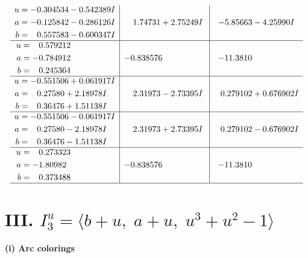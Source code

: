 \documentclass[1p]{elsarticle_modified}
\theoremstyle{definition}
\begin{document}
$$\begin{array}{c|c|c}
\begin{aligned}
u &= -0.304534 - 0.542389 I \\
a &= -0.125842 - 0.286126 I \\
b &= \phantom{-}0.557583 - 0.600347 I\end{aligned}
 & \phantom{-}1.74731 + 2.75249 I & -5.85663 - 4.25990 I \\ \hline\begin{aligned}
u &= \phantom{-}0.579212\phantom{ +0.000000I} \\
a &= -0.784912\phantom{ +0.000000I} \\
b &= \phantom{-}0.245364\phantom{ +0.000000I}\end{aligned}
 & -0.838576\phantom{ +0.000000I} & -11.3810\phantom{ +0.000000I} \\ \hline\begin{aligned}
u &= -0.551506 + 0.061917 I \\
a &= \phantom{-}0.27580 + 2.18978 I \\
b &= \phantom{-}0.36476 + 1.51138 I\end{aligned}
 & \phantom{-}2.31973 - 2.73395 I & \phantom{-}0.279102 + 0.676902 I \\ \hline\begin{aligned}
u &= -0.551506 - 0.061917 I \\
a &= \phantom{-}0.27580 - 2.18978 I \\
b &= \phantom{-}0.36476 - 1.51138 I\end{aligned}
 & \phantom{-}2.31973 + 2.73395 I & \phantom{-}0.279102 - 0.676902 I \\ \hline\begin{aligned}
u &= \phantom{-}0.273323\phantom{ +0.000000I} \\
a &= -1.80982\phantom{ +0.000000I} \\
b &= \phantom{-}0.373488\phantom{ +0.000000I}\end{aligned}
 & -0.838576\phantom{ +0.000000I} & -11.3810\phantom{ +0.000000I}\\
 \hline 
 \end{array}$$\newpage\newpage\renewcommand{\arraystretch}{1}
\centering \section*{III. $I^u_{3}= \langle b+u,\;a+u,\;u^3+u^2-1 \rangle$}
\flushleft \textbf{(i) Arc colorings}\\
\end{document}
